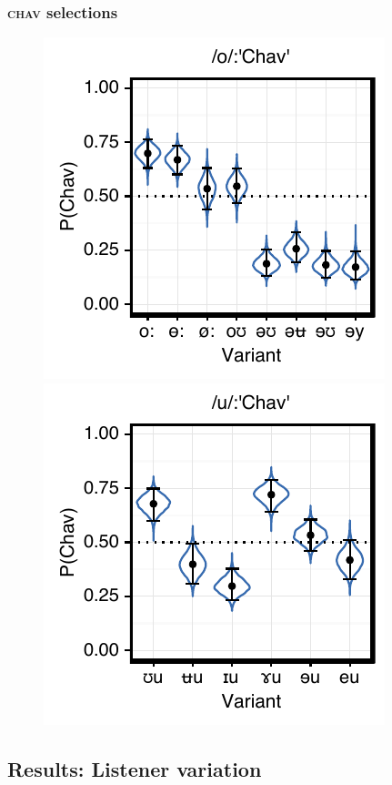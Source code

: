 \documentclass[PWPL]{article}
\begin{document}
\subsubsection{\textsc{chav} selections}
\begin{figure}[ht]
\centering
\includegraphics[scale=0.75]{ow_chav.pdf}
\includegraphics[scale=0.75]{uw_chav.pdf}
\end{figure}
\subsection{Results: Listener variation}
\end{document}
